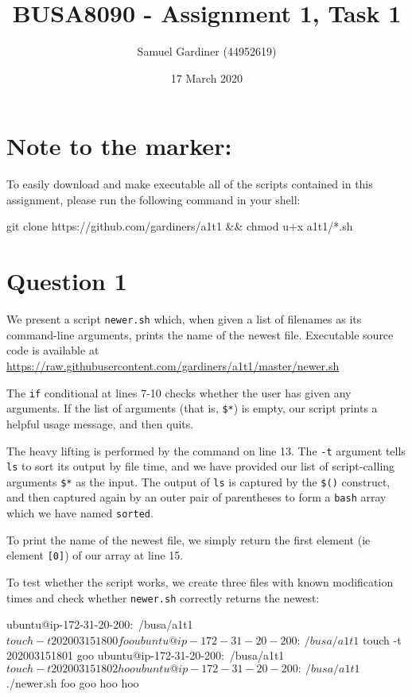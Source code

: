 \documentclass{article}
\title{BUSA8090 - Assignment 1, Task 1}
\author{Samuel Gardiner (44952619)}
\date{17 March 2020}
\begin{document}
\maketitle

\section{Note to the marker:}

To easily download and make executable all of the scripts contained in this assignment, please run the following command in your shell:

\begin{bashcode}
git clone https://github.com/gardiners/a1t1 && chmod u+x a1t1/*.sh
\end{bashcode}

\section{Question 1}

We present a script \texttt{newer.sh} which, when given a list of filenames as its command-line arguments, prints the name of the newest file. Executable source code is available at \url{https://raw.githubusercontent.com/gardiners/a1t1/master/newer.sh}


The \texttt{if} conditional at lines 7-10 checks whether the user has given any arguments. If the list of arguments (that is, \texttt{\$*}) is empty, our script prints a helpful usage message, and then quits.

The heavy lifting is performed by the command  on line 13. The \texttt{-t} argument tells \texttt{ls} to sort its output by file time, and we have provided our list of script-calling arguments \texttt{\$*} as the input. The output of \texttt{ls} is captured by the \texttt{\$()} construct, and then captured again by an outer pair of parentheses to form a \texttt{bash} array which we have named \texttt{sorted}.

To print the name of the newest file, we simply return the first element (ie element \texttt{[0]}) of our array at line 15. 

To test whether the script works, we create three files with known modification times and check whether \texttt{newer.sh} correctly returns the newest:

\begin{bashinline}
ubuntu@ip-172-31-20-200:~/busa/a1t1$ touch -t 202003151800 foo
ubuntu@ip-172-31-20-200:~/busa/a1t1$ touch -t 202003151801 goo
ubuntu@ip-172-31-20-200:~/busa/a1t1$ touch -t 202003151802 hoo
ubuntu@ip-172-31-20-200:~/busa/a1t1$ ./newer.sh foo goo hoo
hoo
\end{bashinline}
\end{document}
